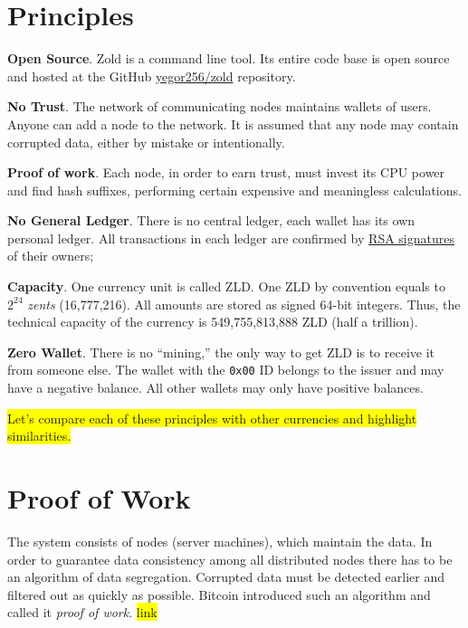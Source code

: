 \documentclass[11pt,oneside]{article}
\newcommand\dd[1]{\colorbox{gray!30}{\texttt{#1}}}
\begin{document}
\section{Principles}

\textbf{Open Source}.
Zold is a command line tool. Its entire code base is open source
and hosted at the GitHub \href{https://github.com/yegor256/zold}{yegor256/zold}
repository.

\textbf{No Trust}.
The network of communicating nodes maintains wallets of users.
Anyone can add a node to the network.
It is assumed that any node may contain corrupted data, either by mistake or intentionally.

\textbf{Proof of work}.
Each node, in order to earn trust, must invest its CPU power
and find hash suffixes, performing certain expensive and meaningless calculations.

\textbf{No General Ledger}.
There is no central ledger, each wallet has its own personal ledger.
All transactions in each ledger are confirmed by
\href{https://en.wikipedia.org/wiki/RSA_(cryptosystem)}{RSA signatures}
of their owners;

\textbf{Capacity}.
One currency unit is called ZLD.
One ZLD by convention equals to $2^{24}$ \emph{zents} (16,777,216).
All amounts are stored as signed 64-bit integers.
Thus, the technical capacity of the currency is 549,755,813,888 ZLD (half a trillion).

\textbf{Zero Wallet}.
There is no ``mining,'' the only way to get ZLD is to receive it from someone else.
The wallet with the \dd{0x00} ID belongs to the
issuer and may have a negative balance. All other wallets
may only have positive balances.

\colorbox{yellow}{Let's compare each of these principles with other currencies and highlight similarities.}

\section{Proof of Work}

The system consists of nodes (server machines), which maintain the data.
In order to guarantee data consistency among all distributed nodes
there has to be an algorithm of data segregation.
Corrupted data must be detected earlier and filtered out as quickly as possible.
Bitcoin introduced such an algorithm and called it \emph{proof of work}.
\colorbox{yellow}{link}
\end{document}
